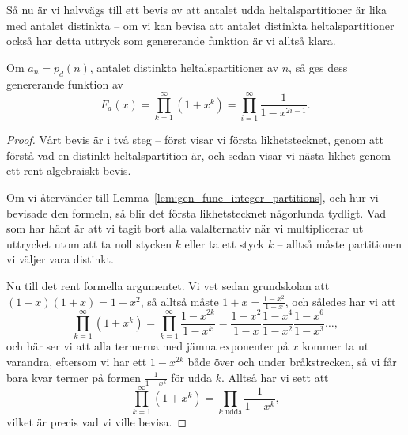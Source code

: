 \documentclass[nobib]{tufte-handout}
\begin{document}
Så nu är vi halvvägs till ett bevis av att antalet udda heltalspartitioner är lika med antalet distinkta -- om vi kan bevisa att antalet distinkta heltalspartitioner också har detta uttryck som genererande funktion är vi alltså klara.

\begin{lemma}
    Om $a_n = p_d(n)$, antalet distinkta heltalspartitioner av $n$, så ges dess genererande funktion av
    $$F_a(x) = \prod_{k=1}^{\infty} (1 + x^k) = \prod_{i=1}^{\infty} \frac{1}{1 - x^{2i-1}}.$$
\end{lemma}
\begin{proof}
    Vårt bevis är i två steg -- först visar vi första likhetstecknet, genom att förstå vad en distinkt heltalspartition är, och sedan visar vi nästa likhet genom ett rent algebraiskt bevis.

    Om vi återvänder till Lemma~\ref{lem:gen_func_integer_partitions}, och hur vi bevisade den formeln, så blir det första likhetstecknet någorlunda tydligt. Vad som har hänt är att vi tagit bort alla valalternativ när vi multiplicerar ut uttrycket utom att ta noll stycken $k$ eller ta ett styck $k$ -- alltså måste partitionen vi väljer vara distinkt.

    Nu till det rent formella argumentet. Vi vet sedan grundskolan att $(1-x)(1+x) = 1 - x^2$, så alltså måste $1 + x = \frac{1 - x^2}{1 - x}$, och således har vi att
    $$\prod_{k=1}^{\infty} (1 + x^k) = \prod_{k=1}^{\infty} \frac{1 - x^{2k}}{1-x^k} = \frac{1 - x^2}{1 - x}\frac{1 - x^4}{1 - x^2}\frac{1 - x^6}{1 - x^3}\ldots,$$
    och här ser vi att alla termerna med jämna exponenter på $x$ kommer ta ut varandra, eftersom vi har ett $1-x^{2k}$ både över och under bråkstrecken, så vi får bara kvar termer på formen $\frac{1}{1 - x^k}$ för udda $k$. Alltså har vi sett att
    $$\prod_{k=1}^{\infty} (1 + x^k) = \prod_{k\text{ udda}} \frac{1}{1 - x^k},$$
    vilket är precis vad vi ville bevisa.
\end{proof}
\end{document}
